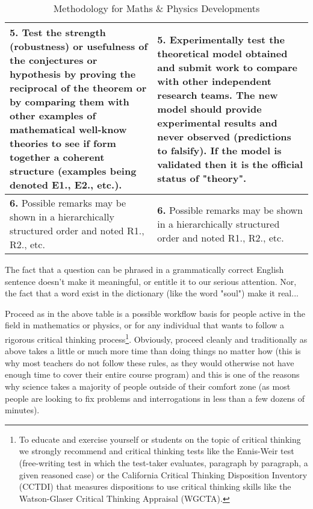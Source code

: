 \begin{table}[H]
\begin{center}
\begin{tabular}{|p{7.5cm}|p{7.5cm}|}
				\textbf{5.} Test the strength (robustness) or usefulness of the conjectures or hypothesis by proving the reciprocal of the theorem or by comparing them with other examples of mathematical well-know theories to see if form together a coherent structure (examples being denoted E1., E2., etc.). & \textbf{5.} Experimentally test the theoretical model obtained and submit work to compare with other independent research teams. The new model should provide experimental results and never observed (predictions to falsify). If the model is validated then it is the official status of "theory".\\ \hline
				\textbf{6.} Possible remarks may be shown in a hierarchically structured order and noted R1., R2., etc. & \textbf{6.} Possible remarks may be shown in a hierarchically structured order and noted R1., R2., etc.			
				\\ \hline
		\end{tabular}
	\end{center}
	\caption{Methodology for Maths \& Physics Developments}
	\end{table}	
	
	
	\begin{tcolorbox}[title=Remark,colframe=black,arc=10pt]
	The fact that a question can be phrased in a grammatically correct English sentence doesn't make it meaningful, or entitle it to our serious attention. Nor, the fact that a word exist in the dictionary (like the word "soul") make it real...
	\end{tcolorbox}
	
	Proceed as in the above table is a possible workflow basis for people active in the field in mathematics or physics, or for any individual that wants to follow a rigorous critical thinking process\footnote{To educate and exercise yourself or students on the topic of critical thinking we strongly recommend \cite{parker2016looseleaf} and critical thinking tests like the Ennis-Weir test (free-writing test in which the test-taker evaluates, paragraph by paragraph, a given reasoned case) or the California Critical Thinking Disposition Inventory (CCTDI) that measures dispositions to use critical thinking skills like the Watson-Glaser Critical Thinking Appraisal (WGCTA).}. Obviously, proceed cleanly and traditionally as above takes a little or much more time than doing things no matter how (this is why most teachers do not follow these rules, as they would otherwise not have enough time to cover their entire course program) and this is one of the reasons why science takes a  majority of people outside of their comfort zone (as most people are looking to fix problems and interrogations in less than a few dozens of minutes).

